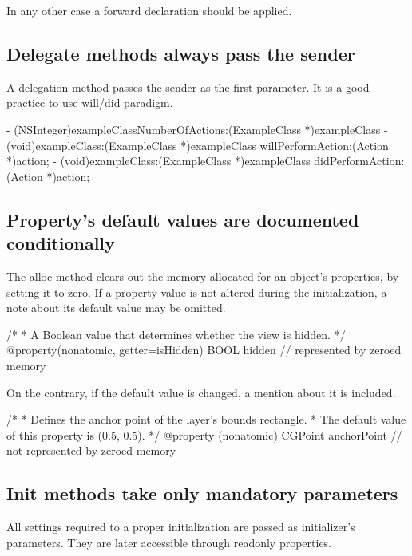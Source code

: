 \documentclass[10pt]{extarticle}
\newenvironment{codelisting}
{\footnotesize\mdframed[middlelinewidth=0.5pt, middlelinecolor=BaliHaiColor, skipabove=15pt]\verbatim}
{\endverbatim\endmdframed\vspace{12pt}\normalsize}
\begin{document}
In any other case a forward declaration should be applied.


\subsection{Delegate methods always pass the sender}

A delegation method passes the sender as the first parameter. It is a good practice to use will/did paradigm.

\begin{codelisting}
- (NSInteger)exampleClassNumberOfActions:(ExampleClass *)exampleClass
- (void)exampleClass:(ExampleClass *)exampleClass willPerformAction:(Action *)action;
- (void)exampleClass:(ExampleClass *)exampleClass didPerformAction:(Action *)action;
\end{codelisting}


\subsection{Property's default values are documented conditionally}

The alloc method clears out the memory allocated for an object’s properties, by setting it to zero. If a property value is not altered during the initialization, a note about its default value may be omitted.

\begin{codelisting}
/*
 * A Boolean value that determines whether the view is hidden.
 */
@property(nonatomic, getter=isHidden) BOOL hidden                // represented by zeroed memory
\end{codelisting}

On the contrary, if the default value is changed, a mention about it is included.

\begin{codelisting}
/*
 * Defines the anchor point of the layer's bounds rectangle.
 * The default value of this property is (0.5, 0.5).
 */
@property (nonatomic) CGPoint anchorPoint                       // not represented by zeroed memory
\end{codelisting}

\subsection{Init methods take only mandatory parameters}

All settings required to a proper initialization are passed as initializer's parameters. They are later accessible through readonly properties.
\end{document}
